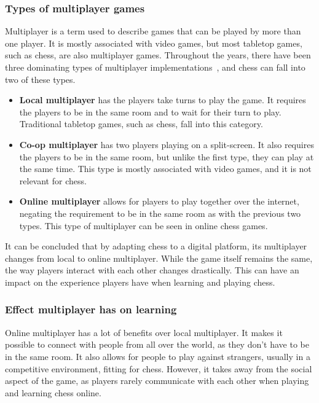\subsubsection{Types of multiplayer games}

Multiplayer is a term used to describe games that can be played by more than one player.
It is mostly associated with video games, but most tabletop games, such as chess, are also multiplayer games.
Throughout the years, there have been three dominating types of multiplayer implementations~\cite{multiplayer-types},
and chess can fall into two of these types.

\begin{itemize}

    \item \textbf{Local multiplayer} has the players take turns to play the game.
    It requires the players to be in the same room and to wait for their turn to play.
    Traditional tabletop games, such as chess, fall into this category.

    \item \textbf{Co-op multiplayer} has two players playing on a split-screen.
    It also requires the players to be in the same room, but unlike the first type, they can play at the same time.
    This type is mostly associated with video games, and it is not relevant for chess.

    \item \textbf{Online multiplayer} allows for players to play together over the internet, negating the requirement to
    be in the same room as with the previous two types.
    This type of multiplayer can be seen in online chess games.

\end{itemize}

It can be concluded that by adapting chess to a digital platform, its multiplayer changes from local to online
multiplayer.
While the game itself remains the same, the way players interact with each other changes drastically.
This can have an impact on the experience players have when learning and playing chess.

\subsubsection{Effect multiplayer has on learning}

Online multiplayer has a lot of benefits over local multiplayer.
It makes it possible to connect with people from all over the world, as they don't have to be in the same room.
It also allows for people to play against strangers, usually in a competitive environment, fitting for chess.
However, it takes away from the social aspect of the game, as players rarely communicate with each other when playing
and learning chess online.

